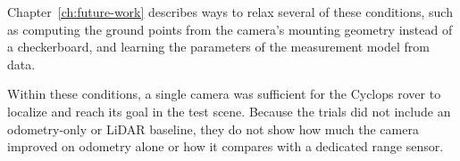 Chapter~\ref{ch:future-work} describes ways to relax several of these conditions, such as
computing the ground points from the camera's mounting geometry instead of a checkerboard, and
learning the parameters of the measurement model from data.

Within these conditions, a single camera was sufficient for the Cyclops rover to localize and
reach its goal in the test scene. Because the trials did not include an odometry-only or LiDAR
baseline, they do not show how much the camera improved on odometry alone or how it compares
with a dedicated range sensor.

